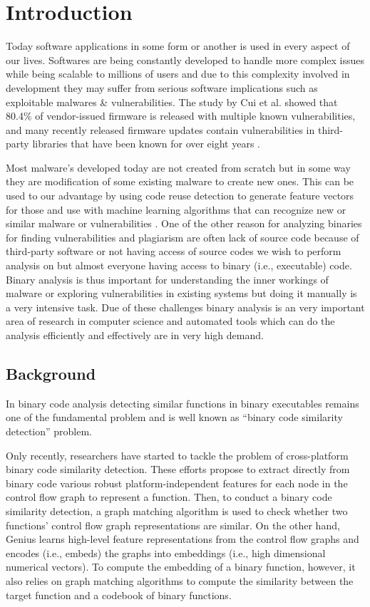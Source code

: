 \chapter{Introduction}
Today software applications in some form or another is used in every aspect of our lives. Softwares are being constantly developed to handle more complex issues while being scalable to millions of users and due to this complexity involved in development they may suffer from serious software implications such as exploitable malwares \& vulnerabilities. The study by Cui et al. showed that 80.4\% of vendor-issued firmware is released with multiple known vulnerabilities, and many
recently released firmware updates contain vulnerabilities in third-party libraries that have been known for over eight years \cite{Cui}. 

Most malware's developed today are not created from scratch but in some way they are modification of some existing malware to create new ones. This can be used to our advantage by using code reuse detection to generate feature vectors for those and use with machine learning algorithms that can recognize new or similar malware or vulnerabilities \cite{Jang}. One of the other reason for analyzing binaries for finding vulnerabilities and plagiarism are often lack of source code because of third-party software\cite{Saeb} or not having access of source codes we wish to perform analysis on but almost everyone having access to binary (i.e., executable) code. Binary analysis is thus important for understanding the inner workings of malware or exploring vulnerabilities in existing systems but doing it manually is a very intensive task. Due of these challenges binary analysis is an very important area of research in computer science and automated tools which can do the analysis efficiently and effectively are in very high demand.
\section{Background}
In binary code analysis detecting similar functions in binary executables remains one of the fundamental problem and is well known as ``binary code similarity detection'' problem. 

Only recently, researchers have started to tackle the problem of cross-platform binary code similarity detection. These efforts propose to extract directly from binary code
various robust platform-independent features for each node in the control flow graph to represent a function. Then, to conduct a binary code similarity detection, a graph matching algorithm is used to
check whether two functions’ control flow graph representations are similar. On the other hand, Genius learns high-level feature representations from the control flow graphs and encodes
(i.e., embeds) the graphs into embeddings (i.e., high dimensional numerical vectors). To compute the embedding of a binary function, however, it also relies on graph matching algorithms to compute
the similarity between the target function and a codebook of binary functions.

